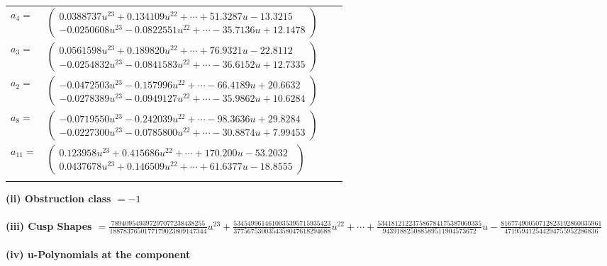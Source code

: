\documentclass[1p]{elsarticle_modified}
\theoremstyle{definition}
\begin{document}
\begin{tabular}{m{7pt} m{180pt} m{7pt} m{180pt} }
\flushright $a_{4}=$&$\begin{pmatrix}0.0388737 u^{23}+0.134109 u^{22}+\cdots+51.3287 u-13.3215\\-0.0250608 u^{23}-0.0822551 u^{22}+\cdots-35.7136 u+12.1478\end{pmatrix}$ \\
\flushright $a_{3}=$&$\begin{pmatrix}0.0561598 u^{23}+0.189820 u^{22}+\cdots+76.9321 u-22.8112\\-0.0254832 u^{23}-0.0841583 u^{22}+\cdots-36.6152 u+12.7335\end{pmatrix}$ \\
\flushright $a_{2}=$&$\begin{pmatrix}-0.0472503 u^{23}-0.157996 u^{22}+\cdots-66.4189 u+20.6632\\-0.0278389 u^{23}-0.0949127 u^{22}+\cdots-35.9862 u+10.6284\end{pmatrix}$ \\
\flushright $a_{8}=$&$\begin{pmatrix}-0.0719550 u^{23}-0.242039 u^{22}+\cdots-98.3636 u+29.8284\\-0.0227300 u^{23}-0.0785800 u^{22}+\cdots-30.8874 u+7.99453\end{pmatrix}$ \\
\flushright $a_{11}=$&$\begin{pmatrix}0.123958 u^{23}+0.415686 u^{22}+\cdots+170.200 u-53.2032\\0.0437678 u^{23}+0.146509 u^{22}+\cdots+61.6377 u-18.8555\end{pmatrix}$\\&\end{tabular}
\flushleft \textbf{(ii) Obstruction class $= -1$}\\~\\
\flushleft \textbf{(iii) Cusp Shapes $= \frac{789409549397297077238438255}{1887837650177179023809147344} u^{23}+\frac{5345499614610035395715935423}{3775675300354358047618294688} u^{22}+\cdots+\frac{534181212237586784175387060335}{943918825088589511904573672} u-\frac{81677490050712823192860035961}{471959412544294755952286836}$}\\~\\
\newpage\renewcommand{\arraystretch}{1}
\flushleft \textbf{(iv) u-Polynomials at the component}\newline \\
\end{document}
